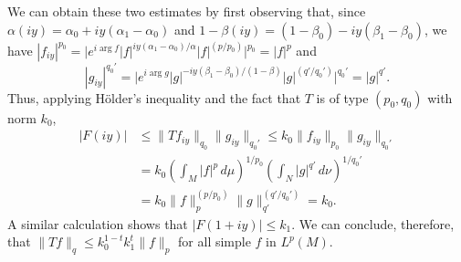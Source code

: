 We can obtain these two estimates by first observing that, since
$\alpha(iy) = \alpha_{0} + iy(\alpha_{1} - \alpha_{0})$ and
$1 - \beta(iy) = (1 - \beta_{0}) - iy(\beta_{1} - \beta_{0})$, we have
$|f_{iy}|^{p_{0}} = \bigl|e^{i\arg f}|f|^{iy(\alpha_{1} - \alpha_{0})/\alpha}|f|^{(p/p_{0})}\bigr|^{p_{0}} = |f|^{p}$
and
\[
|g_{iy}|^{q_{0}'}=\bigl|e^{i\arg g}|g|^{-iy(\beta_{1}-\beta_{0})/(1-\beta)}|g|^{(q'/q_{0}')}\bigr|^{q_{0}'}=|g|^{q'}.
\]
Thus, applying H\"older's inequality and the fact that $T$ is of type
$(p_{0}, q_{0})$ with norm $k_{0}$,
\begin{align*}
|F(iy)|&\leq\|Tf_{iy}\|_{q_{0}}\|g_{iy}\|_{q_{0}'}
\leq k_{0}\|f_{iy}\|_{p_{0}}\|g_{iy}\|_{q_{0}'}\\
&=k_{0}\left(\int_{M}|f|^{p}\,d\mu\right)^{1/p_{0}}
\left(\int_{N}|g|^{q'}\,d\nu\right)^{1/q_{0}'}\\
&=k_{0}\|f\|_{p}^{(p/p_{0})}\|g\|_{q'}^{(q'/q_{0}')}=k_{0}.
\end{align*}
A similar calculation shows that $|F(1 + iy)| \leq k_{1}$. We can conclude,
therefore, that $\|Tf\|_{q} \leq k_{0}^{1-t}k_{1}^{t}\|f\|_{p}$ for all simple
$f$ in $L^{p}(M)$.

